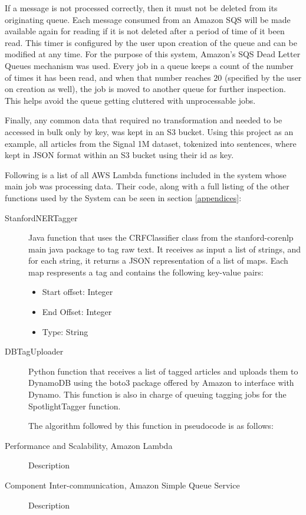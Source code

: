If a message is not processed correctly, then it must not be deleted from its originating queue.
Each message consumed from an Amazon SQS will be made available again for reading if it is not deleted after a period of time of it been read.
This timer is configured by the user upon creation of the queue and can be modified at any time.
For the purpose of this system, Amazon's SQS Dead Letter Queues mechanism was used.
Every job in a queue keeps a count of the number of times it has been read, and when that number reaches $20$ (specified by the user on creation as well), the job is moved to another queue for further inspection. This helps avoid the queue getting cluttered with unprocessable jobs. 

Finally, any common data that required no transformation and needed to be accessed in bulk only by key, was kept in an S3 bucket.
Using this project as an example, all articles from the Signal 1M dataset, tokenized into sentences,
where kept in JSON format within an S3 bucket using their id as key.

Following is a list of all AWS Lambda functions included in the system whose main job was processing data.
Their code, along with a full listing of the other functions used by the System
can be seen in section \ref{appendices}:
\begin{description}
\item[StanfordNERTagger]
Java function that uses the CRFClassifier class from the stanford-corenlp main java package to tag raw text.
It receives as input a list of strings, and for each string, it returns a JSON representation of a list of maps.
Each map respresents a tag and contains the following key-value pairs:
\begin{itemize}
  \item Start offset: Integer
  \item End Offset: Integer
  \item Type: String
\end{itemize}
\item[DBTagUploader]
Python function that receives a list of tagged articles and uploads them to DynamoDB using the boto3 package
offered by Amazon to interface with Dynamo.
This function is also in charge of queuing tagging jobs for the SpotlightTagger function.

The algorithm followed by this function in pseudocode is as follows:



\item[Performance and Scalability, Amazon Lambda] Description
\item[Component Inter-communication, Amazon Simple Queue Service] Description
\end{description}

